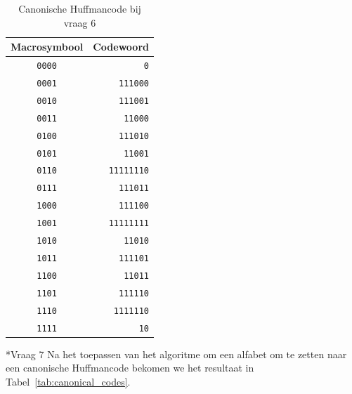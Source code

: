 \documentclass[]{article}
\begin{document}
\begin{section}
\begin{subsection}
        \begin{table}
            \centering
            \begin{tabular}{c|r}
                \textbf{Macrosymbool} &
                \textbf{Codewoord} \\
                \hline
                \texttt{0000} & \texttt{0} \\
                \texttt{0001} & \texttt{111000} \\
                \texttt{0010} & \texttt{111001} \\
                \texttt{0011} & \texttt{11000} \\
                \texttt{0100} & \texttt{111010} \\
                \texttt{0101} & \texttt{11001} \\
                \texttt{0110} & \texttt{11111110} \\
                \texttt{0111} & \texttt{111011} \\
                \texttt{1000} & \texttt{111100} \\
                \texttt{1001} & \texttt{11111111} \\
                \texttt{1010} & \texttt{11010} \\
                \texttt{1011} & \texttt{111101} \\
                \texttt{1100} & \texttt{11011} \\
                \texttt{1101} & \texttt{111110} \\
                \texttt{1110} & \texttt{1111110} \\
                \texttt{1111} & \texttt{10} \\
            \end{tabular}
            \caption{Canonische Huffmancode bij vraag 6}
            \label{tab:canonical_huffman}
        \end{table}

    \end{subsection}

    \begin{subsection}*{Vraag 7}
        Na het toepassen van het algoritme om een alfabet om te zetten
        naar een canonische Huffmancode bekomen we het resultaat in
        Tabel~\ref{tab:canonical_codes}.


\end{subsection}
\end{section}
\end{document}
